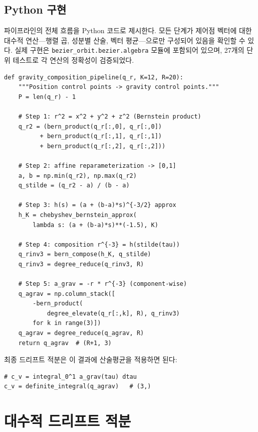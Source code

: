 \documentclass[11pt]{article}
\begin{document}
\subsection{Python 구현}

파이프라인의 전체 흐름을 Python 코드로 제시한다.
모든 단계가 제어점 벡터에 대한 대수적 연산---행렬 곱, 성분별 산술, 벡터
평균---으로만 구성되어 있음을 확인할 수 있다.
실제 구현은 \texttt{bezier\_orbit.bezier.algebra} 모듈에 포함되어 있으며,
27개의 단위 테스트로 각 연산의 정확성이 검증되었다.

\begin{lstlisting}[style=pythonstyle,
  caption={Gravity composition pipeline (\texttt{gravity\_composition\_pipeline})},
  label={lst:pipeline}]
def gravity_composition_pipeline(q_r, K=12, R=20):
    """Position control points -> gravity control points."""
    P = len(q_r) - 1

    # Step 1: r^2 = x^2 + y^2 + z^2 (Bernstein product)
    q_r2 = (bern_product(q_r[:,0], q_r[:,0])
          + bern_product(q_r[:,1], q_r[:,1])
          + bern_product(q_r[:,2], q_r[:,2]))

    # Step 2: affine reparameterization -> [0,1]
    a, b = np.min(q_r2), np.max(q_r2)
    q_stilde = (q_r2 - a) / (b - a)

    # Step 3: h(s) = (a + (b-a)*s)^{-3/2} approx
    h_K = chebyshev_bernstein_approx(
        lambda s: (a + (b-a)*s)**(-1.5), K)

    # Step 4: composition r^{-3} = h(stilde(tau))
    q_rinv3 = bern_compose(h_K, q_stilde)
    q_rinv3 = degree_reduce(q_rinv3, R)

    # Step 5: a_grav = -r * r^{-3} (component-wise)
    q_agrav = np.column_stack([
        -bern_product(
            degree_elevate(q_r[:,k], R), q_rinv3)
        for k in range(3)])
    q_agrav = degree_reduce(q_agrav, R)
    return q_agrav  # (R+1, 3)
\end{lstlisting}

\noindent
최종 드리프트 적분은 이 결과에 산술평균을 적용하면 된다:

\begin{lstlisting}[style=pythonstyle,
  caption={Drift integral via control point mean},
  label={lst:drift}]
# c_v = integral_0^1 a_grav(tau) dtau
c_v = definite_integral(q_agrav)   # (3,)
\end{lstlisting}

\section{대수적 드리프트 적분}
\label{sec:drift}
\end{document}
